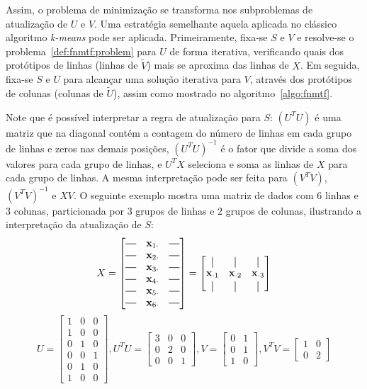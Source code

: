 \documentclass[
    12pt,                %
    oneside,            %
    a4paper,            %
    english,            %
    brazil                %
    ]{abntex2ppgsi}
\newcommand*{\horzbar}{\rule[.5ex]{2.5ex}{0.5pt}}
\newcommand*{\vertbar}{\rule[-1ex]{0.5pt}{2.5ex}}
\begin{document}
Assim, o problema de minimização se transforma nos subproblemas de atualização de $U$ e $V$.
Uma estratégia semelhante aquela aplicada no clássico algoritmo \textit{k-means} pode ser aplicada.
Primeiramente, fixa-se $S$ e $V$ e resolve-se o problema~\ref{def:fnmtf:problem} para $U$ de forma iterativa, verificando quais dos protótipos de linhas (linhas de $\widetilde{V}$) mais se aproxima das linhas de $X$.
Em seguida, fixa-se $S$ e $U$ para alcançar uma solução iterativa para $V$, através dos protótipos de colunas (colunas de $\widetilde{U}$), assim como mostrado no algoritmo~\ref{algo:fnmtf}.

Note que é possível interpretar a regra de atualização para $S$: $(U^T U)$ é uma matriz que na diagonal contém a contagem do número de linhas em cada grupo de linhas e zeros nas demais posições, $(U^T U)^{-1}$ é o fator que divide a soma dos valores para cada grupo de linhas, e $U^T X$ seleciona e soma as linhas de $X$ para cada grupo de linhas.
A mesma interpretação pode ser feita para $(V^T V)$, $(V^T V)^{-1}$ e $XV$.
O seguinte exemplo mostra uma matriz de dados com $6$ linhas e $3$ colunas, particionada por $3$ grupos de linhas e $2$ grupos de colunas, ilustrando a interpretação da atualização de $S$:
\[
X = \begin{bmatrix}
\horzbar & \mathbf{x}_{1 \cdot} & \horzbar \\
\horzbar & \mathbf{x}_{2 \cdot} & \horzbar \\
\horzbar & \mathbf{x}_{3 \cdot} & \horzbar \\
\horzbar & \mathbf{x}_{4 \cdot} & \horzbar \\
\horzbar & \mathbf{x}_{5 \cdot} & \horzbar \\
\horzbar & \mathbf{x}_{6 \cdot} & \horzbar
\end{bmatrix}
= \begin{bmatrix}
\vertbar             & \vertbar             & \vertbar             \\
\mathbf{x}_{\cdot 1} & \mathbf{x}_{\cdot 2} & \mathbf{x}_{\cdot 3} \\
\vertbar             & \vertbar             & \vertbar
\end{bmatrix}
\]
\[
U = \begin{bmatrix}
1 & 0 & 0 \\
1 & 0 & 0 \\
0 & 1 & 0 \\
0 & 0 & 1 \\
0 & 1 & 0 \\
1 & 0 & 0
\end{bmatrix},
U^T U = \begin{bmatrix}
3 & 0 & 0 \\
0 & 2 & 0 \\
0 & 0 & 1
\end{bmatrix},
V = \begin{bmatrix}
0 & 1 \\
0 & 1 \\
1 & 0
\end{bmatrix},
V^T V = \begin{bmatrix}
1 & 0 \\
0 & 2
\end{bmatrix}
\]
\end{document}
